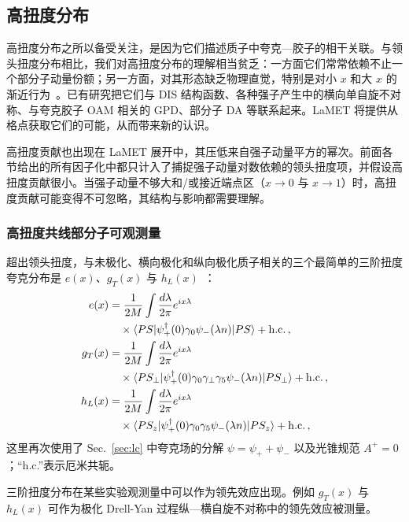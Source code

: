 \subsection{高扭度分布}
\label{sec:others-ht}

高扭度分布之所以备受关注，是因为它们描述质子中夸克—胶子的相干关联。与领头扭度分布相比，我们对高扭度分布的理解相当贫乏：一方面它们常常依赖不止一个部分子动量份额；另一方面，对其形态缺乏物理直觉，特别是对小 $x$ 和大 $x$ 的渐近行为~\cite{Braun:2011aw}。已有研究把它们与 DIS 结构函数、各种强子产生中的横向单自旋不对称、与夸克胶子 OAM 相关的 GPD、部分子 DA 等联系起来。LaMET 将提供从格点获取它们的可能，从而带来新的认识。

高扭度贡献也出现在 LaMET 展开中，其压低来自强子动量平方的幂次。前面各节给出的所有因子化中都只计入了捕捉强子动量对数依赖的领头扭度项，并假设高扭度贡献很小。当强子动量不够大和/或接近端点区（$x\to0$ 与 $x\to1$）时，高扭度贡献可能变得不可忽略，其结构与影响都需要理解。


\subsubsection{高扭度共线部分子可观测量}

超出领头扭度，与未极化、横向极化和纵向极化质子相关的三个最简单的三阶扭度夸克分布是
$e(x)$、$g_T(x)$ 与 $h_L(x)$~\cite{Jaffe:1991ra}：
\begin{align}
	e(x) &= \frac{1}{2M}\int \frac{d\lambda}{2\pi}e^{ix\lambda} \\
	&\quad\times \langle PS|\psi^\dagger_+(0)\gamma_0\psi_-(\lambda n)|PS\rangle + {\rm h.c.}  \,, \nonumber\\
	g_T(x)& = \frac{1}{2M}\int \frac{d\lambda}{2\pi}e^{ix\lambda}  \\
	&\quad\times \langle PS_\perp|\psi^\dagger_+(0)\gamma_0\gamma_\perp\gamma_5\psi_-(\lambda n)|PS_\perp\rangle + {\rm h.c.} \,,\nonumber\\
	h_L(x)&  =\frac{1}{2M}\int \frac{d\lambda}{2\pi} e^{ix\lambda} \\
	&\quad\times \langle PS_z|\psi^\dagger_+(0)\gamma_0\gamma_5\psi_-(\lambda n)|PS_z\rangle + {\rm h.c.}  \,,\nonumber
	\label{eq:twist3}
\end{align}
这里再次使用了 Sec.~\ref{sec:lc} 中夸克场的分解 $\psi=\psi_+ +\psi_-$ 以及光锥规范 $A^+=0$；``h.c.''表示厄米共轭。

三阶扭度分布在某些实验观测量中可以作为领先效应出现。例如 $g_T(x)$ 与 $h_L(x)$ 可作为极化 Drell-Yan 过程纵—横自旋不对称中的领先效应被测量。

